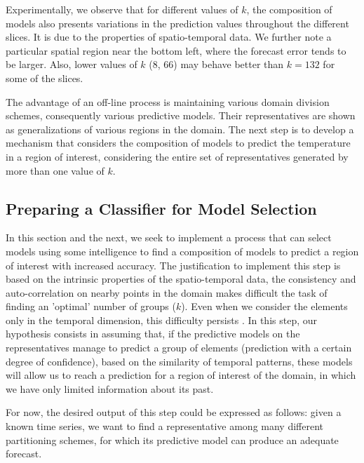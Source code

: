 Experimentally, we observe that for different values of $k$, the composition of models also presents variations in the prediction values throughout the different slices. It is due to the properties of spatio-temporal data. We further note a particular spatial region near the bottom left, where the forecast error tends to be larger. Also, lower values of $k$ (8, 66) may behave better than $k=132$ for some of the slices. 

The advantage of an off-line process is maintaining various domain division schemes, consequently various predictive models. Their representatives are shown as generalizations of various regions in the domain. The next step is to develop a mechanism that considers the composition of models to predict the temperature in a region of interest, considering the entire set of representatives generated by more than one value of $k$.

\subsection{Preparing a Classifier for Model Selection}
\label{Sec:Classifier}

In this section and the next, we seek to implement a process that can select models using some intelligence to find a composition of models to predict a region of interest with increased accuracy. The justification to implement this step is based on the intrinsic properties of the spatio-temporal data, the consistency and auto-correlation on nearby points in the domain makes difficult the task of finding an 'optimal' number of groups ($k$). Even when we consider the elements only in the temporal dimension, this difficulty persists \cite{Aghabozorgi2015}. In this step, our hypothesis consists in assuming that, if the predictive models on the representatives manage to predict a group of elements (prediction with a certain degree of confidence), based on the similarity of temporal patterns, these models will allow us to reach a prediction for a region of interest of the domain, in which we have only limited information about its past. 

For now, the desired output of this step could be expressed as follows: given a known time series, we want to find a representative among many different partitioning schemes, for which its predictive model can produce an adequate forecast.

